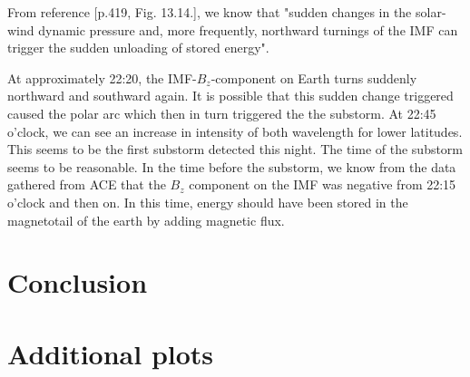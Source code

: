 \documentclass[10pt,a4paper]{article}
\begin{document}
From reference \cite{Buch2}[p.419, Fig. 13.14.], we know that 
"sudden changes in the solar-wind dynamic pressure and, more frequently, northward turnings of the IMF can trigger the sudden unloading of stored energy".

At approximately 22:20, the IMF-$B_z$-component on Earth turns suddenly northward and southward again. It is possible that this sudden change triggered caused the polar arc which 
then in turn triggered the the substorm. At 22:45 o'clock, we can see an increase in intensity of both wavelength for lower latitudes. This seems to be the first substorm detected 
this night. The time of the substorm seems to be reasonable. In the time before the substorm, we know from the data gathered from ACE that the $B_z$ component on the IMF was negative from
22:15 o'clock and then on. In this time, energy should have been stored in the magnetotail of the earth by adding magnetic flux.  



\section{Conclusion}




\newpage
\section{Additional plots}
\end{document}
